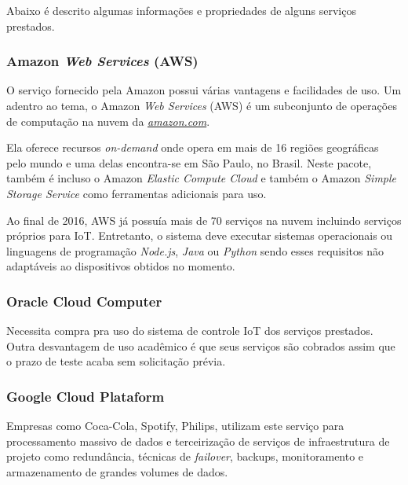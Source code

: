 \documentclass[portugues, brazil, a4paper,12pt]{article}
\begin{document}
		Abaixo é descrito algumas informações e propriedades de alguns serviços prestados.

		\subsubsection{Amazon \textit{Web Services} (AWS)}
			O serviço fornecido pela Amazon possui várias vantagens e facilidades de uso. Um adentro ao tema, o Amazon \textit{Web Services} (AWS) é um subconjunto de operações de computação na nuvem da \href{https://www.amazon.com}{\textit{amazon.com}}.

			Ela oferece recursos \textit{on-demand} onde opera em mais de 16 regiões geográficas pelo mundo e uma delas encontra-se em São Paulo, no Brasil. Neste pacote, também é incluso o Amazon \textit{Elastic Compute Cloud} e também o Amazon \textit{Simple Storage Service} como ferramentas adicionais para uso.

			Ao final de 2016, AWS já possuía mais de 70 serviços na nuvem incluindo serviços próprios para IoT. Entretanto, o sistema deve executar sistemas operacionais ou linguagens de programação \textit{Node.js}, \textit{Java} ou \textit{Python} sendo esses requisitos não adaptáveis ao dispositivos obtidos no momento.



		\subsubsection{Oracle Cloud Computer}
			Necessita compra pra uso do sistema de controle IoT dos serviços prestados. Outra desvantagem de uso acadêmico é que seus serviços são cobrados assim que o prazo de teste acaba sem solicitação prévia.


		\subsubsection{Google Cloud Plataform}

			Empresas como Coca-Cola, Spotify, Philips, utilizam este serviço para processamento massivo de dados e terceirização de serviços de infraestrutura de projeto como redundância, técnicas de \textit{failover}, backups, monitoramento e armazenamento de grandes volumes de dados.
\end{document}
